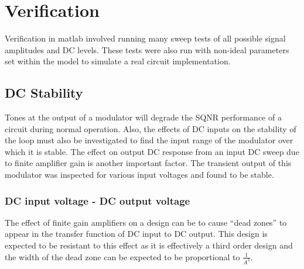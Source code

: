 \section{Verification}
\label{Verification}
Verification in matlab involved running many sweep tests of all possible signal amplitudes and DC levels.
These tests were also run with non-ideal parameters set within the model to simulate a real circuit implementation.

    \subsection{DC Stability}
    \label{Verification:DCstab}
    Tones at the output of a modulator will degrade the SQNR performance of a circuit during normal operation.
    Also, the effects of DC inputs on the stability of the loop must also be investigated to find the input range of the modulator over which it is stable. 
    The effect on output DC response from an input DC sweep due to finite amplifier gain is another important factor.
    The transient output of this modulator was inspected for various input voltages and found to be stable.



        \subsubsection{DC input voltage - DC output voltage}
        \label{Verification:DCinputoutput}
        The effect of finite gain amplifiers on a design can be to cause ``dead zones'' to appear in the transfer function of DC input to DC output.
        This design is expected to be resistant to this effect as it is effectively a third order design and the width of the dead zone can be expected to be proportional to $\frac{1}{A^{3}}$.


